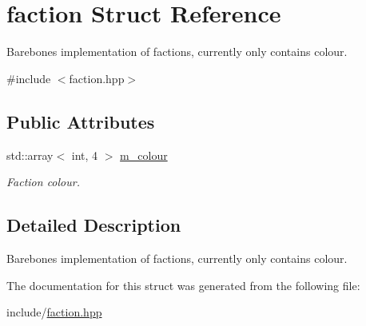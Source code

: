 \hypertarget{structfaction}{\section{faction Struct Reference}
\label{structfaction}
}


Barebones implementation of factions, currently only contains colour.  




{\ttfamily \#include $<$faction.\-hpp$>$}

\subsection*{Public Attributes}
\begin{DoxyCompactItemize}
\item 
\hypertarget{structfaction_a05566e5c37033a6a895cd64ff5ce5479}{std\-::array$<$ int, 4 $>$ \hyperlink{structfaction_a05566e5c37033a6a895cd64ff5ce5479}{m\-\_\-colour}}\label{structfaction_a05566e5c37033a6a895cd64ff5ce5479}

\begin{DoxyCompactList}\small\item\em Faction colour. \end{DoxyCompactList}\end{DoxyCompactItemize}


\subsection{Detailed Description}
Barebones implementation of factions, currently only contains colour. 

The documentation for this struct was generated from the following file\-:\begin{DoxyCompactItemize}
\item 
include/\hyperlink{faction_8hpp}{faction.\-hpp}\end{DoxyCompactItemize}
